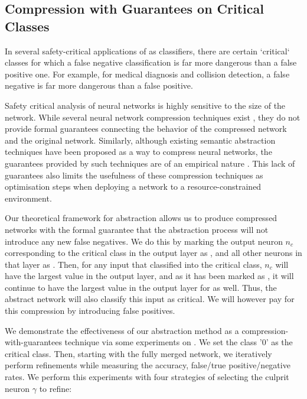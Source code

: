 \subsection{Compression with Guarantees on Critical Classes}
\label{s:exp-mnist-comp}

In several safety-critical applications of \dnn as classifiers, there are
certain `critical` classes for which a false negative classification is far more
dangerous than a false positive one. For example, for medical diagnosis and
collision detection, a false negative is far more dangerous than a false
positive.

Safety critical analysis of neural networks is highly sensitive to the size of
the network. While several neural network compression techniques exist 
\cite{dnn-compression}, they do not provide formal guarantees 
connecting the behavior of the compressed network and the original network.
Similarly, although existing semantic abstraction techniques have been proposed
as a way to compress neural networks, the guarantees provided by such 
techniques are of an empirical nature \cite{lin-comb-abs-jan}.
This lack of guarantees also limits the usefulness of these compression
techniques as optimisation steps when deploying a network to a
resource-constrained environment. 

Our theoretical framework for abstraction allows us to produce compressed
networks with the formal guarantee that the abstraction process will not
introduce any new false negatives. We do this by marking the output neuron $n_c$
corresponding to the critical class in the output layer as \inc, and all other
neurons in that layer as \dec.  Then, for any input that \cnc classified into
the critical class, $n_c$ will have the largest value in the
output layer, and as it has been marked as \inc, it will continue to have the
largest value in the output layer for \abs as well. Thus, the
abstract network will also classify this input as critical. We will however pay
for this compression by introducing false positives.

We demonstrate the effectiveness of our abstraction method as a
compression-with-guarantees technique via some experiments on \mnist. We set the
class '0'
as the critical class. Then, starting with the fully merged network, we
iteratively perform refinements while measuring the accuracy, false/true
positive/negative rates. We perform this experiments with four strategies of
selecting the culprit neuron $\gamma$ to refine:

